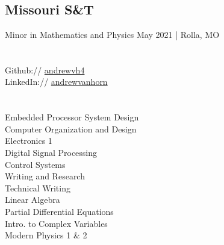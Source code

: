 \documentclass[]{deedy-resume-andrewvanhorn}
\begin{document}
%
%
\lastupdated

%
%



%
%

\begin{minipage}[t]{0.33\textwidth} 

\sectionsep
\sectionsep
\sectionsep
\sectionsep
\section{} 

\subsection{Missouri S\&T}
Minor in Mathematics and Physics
May 2021 | Rolla, MO\\
\sectionsep


\section{} 
Github:// \href{https://github.com/andrewvh4}{andrewvh4} \\
LinkedIn:// \href{https://www.linkedin.com/in/andrewvanhorn/}{andrewvanhorn} \\
\sectionsep


\section{}
Embedded Processor System Design\\
Computer Organization and Design\\
Electronics 1\\
Digital Signal Processing\\
Control Systems\\
Writing and Research\\
Technical Writing\\
Linear Algebra\\
Partial Differential Equations\\
Intro. to Complex Variables\\
Modern Physics 1 \& 2


\end{minipage}
\end{document}
